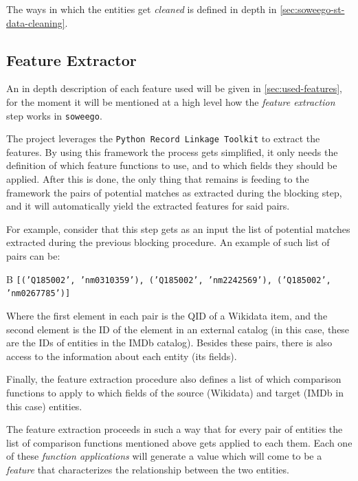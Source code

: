 \documentclass[epsfig,a4paper,11pt,titlepage,twoside,openany]{book}
\begin{document}
The ways in which the entities get \textit{cleaned} is defined in depth in \autoref{sec:soweego-st-data-cleaning}. 


\subsection{Feature Extractor}
\label{sec:soweego-st-feature-ext}

An in depth description of each feature used will be given in \autoref{sec:used-features}, for the moment it will be mentioned at a high level how the \textit{feature extraction} step works in \texttt{soweego}. 

The project leverages the \texttt{Python Record Linkage Toolkit} \cite{recordlinkage-library} to extract the features. By using this framework the process gets simplified, it only needs the definition of which feature functions to use, and to which fields they should be applied. 
After this is done, the only thing that remains is feeding to the framework the pairs of potential matches as extracted during the blocking step, and it will automatically yield the extracted features for said pairs.

For example, consider that this step gets as an input the list of potential matches extracted during the previous blocking procedure. An example of such list of pairs can be: 

\begin{center}B
    \texttt{[('Q185002', 'nm0310359'), ('Q185002', 'nm2242569'), ('Q185002', 'nm0267785')]}
\end{center}

Where the first element in each pair is the QID of a Wikidata item, and the second element is the ID of the element in an external catalog (in this case, these are the IDs of entities in the IMDb catalog). Besides these pairs, there is also access to the information about each entity (its fields). 

Finally, the feature extraction procedure also defines a list of which comparison functions to apply to which fields of the source (Wikidata) and target (IMDb in this case) entities.

The feature extraction proceeds in such a way that for every pair of entities the list of comparison functions mentioned above gets applied to each them. Each one of these \textit{function applications} will generate a value which will come to be a \textit{feature} that characterizes the relationship between the two entities.
\end{document}
